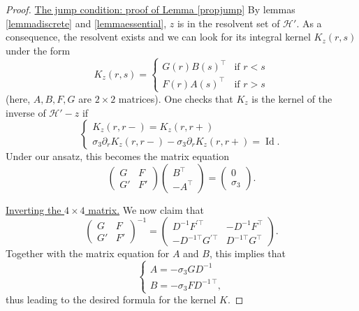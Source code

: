 \documentclass[11 pt]{amsart}
\theoremstyle{definition}
\theoremstyle{remark}
\numberwithin{equation}{section}
\begin{document}
\begin{proof} 
\underline{The jump condition: proof of Lemma \ref{propjump}} By lemmas \ref{lemmadiscrete} and \ref{lemmaessential}, $z$ is in the resolvent set of $\mathcal{H}'$. As a consequence, the resolvent exists and we can look for its integral kernel $K_z(r,s)$ under the form
$$
K_z(r,s) = \begin{cases}
G(r) B(s)^\top & \mbox{if $r<s$}\\
F(r) A(s)^\top & \mbox{if $r>s$}
\end{cases}
$$
(here, $A,B,F,G$ are $2 \times 2$ matrices).
One checks that $K_z$ is the kernel of the inverse of $\mathcal{H}'- z$ if
$$
\begin{cases}
K_z(r,r-) = K_z(r,r+) \\
\sigma_3 \partial_r K_z(r,r-) - \sigma_3 \partial_r K_z(r,r+) = \operatorname{Id}.
\end{cases}
$$
Under our ansatz, this becomes the matrix equation
$$
\begin{pmatrix}
G & F \\
G'& F'
\end{pmatrix}
\begin{pmatrix}
B^\top \\ -A^\top
\end{pmatrix}
= 
\begin{pmatrix}
0 \\ \sigma_3
\end{pmatrix}.
$$

\bigskip

\noindent \underline{Inverting the $4\times 4$ matrix.} We now claim that
\begin{equation}
\label{inverseFG}
\begin{pmatrix} G & F \\ G' & F' \end{pmatrix}^{-1} = 
\begin{pmatrix} D^{-1} F^{' \top} & - D^{-1} F^\top \\ - D^{-1 \top} G^{' \top } & D^{-1 \top} G^\top \end{pmatrix}.
\end{equation}
Together with the matrix equation for $A$ and $B$, this implies that
$$
\begin{cases}
A = - \sigma_3 G D^{-1 } \\
B = -\sigma_3 F D^{-1 \, \top},
\end{cases}
$$
thus leading to the desired formula for the kernel $K$.


\end{proof}
\end{document}
